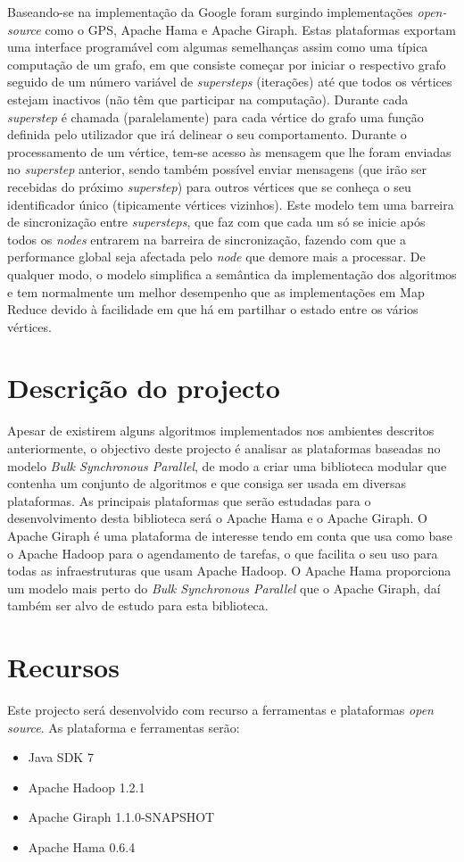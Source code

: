 Baseando-se na implementação da Google foram surgindo implementações \textit{open-source} como o GPS\cite{docgps}, Apache Hama\cite{hama} e Apache Giraph\cite{giraph}.
Estas plataformas exportam uma interface programável com algumas semelhanças assim como uma típica computação de um grafo, em que consiste começar por iniciar o respectivo grafo seguido de um número variável de \textit{supersteps} (iterações) até que todos os vértices estejam inactivos (não têm que participar na computação).
Durante cada \textit{superstep} é chamada (paralelamente) para cada vértice do grafo uma função definida pelo utilizador que irá delinear o seu comportamento.
Durante o processamento de um vértice, tem-se acesso às mensagem que lhe foram enviadas no \textit{superstep} anterior, sendo também possível enviar mensagens (que irão ser recebidas do próximo \textit{superstep}) para outros vértices que se conheça o seu identificador único (tipicamente vértices vizinhos).
Este modelo tem uma barreira de sincronização entre \textit{supersteps}, que faz com que cada um só se inicie após todos os \textit{nodes} entrarem na barreira de sincronização, fazendo com que a performance global seja afectada pelo \textit{node} que demore mais a processar.
De qualquer modo, o modelo simplifica a semântica da implementação dos algoritmos e tem normalmente um melhor desempenho que as implementações em Map Reduce devido à facilidade em que há em partilhar o estado entre os vários vértices. 


\section{Descrição do projecto}
Apesar de existirem alguns algoritmos implementados nos ambientes descritos anteriormente, o objectivo deste projecto é analisar as plataformas
baseadas no modelo \textit{Bulk Synchronous Parallel}, de modo a criar uma biblioteca modular que contenha um conjunto de algoritmos e que consiga
ser usada em diversas plataformas. As principais plataformas que serão estudadas para o desenvolvimento desta biblioteca será o Apache Hama e o Apache Giraph. 
O Apache Giraph é uma plataforma de interesse tendo em conta que usa como base o Apache Hadoop para o agendamento de tarefas, o que facilita o seu uso
para todas as infraestruturas que usam Apache Hadoop. O Apache Hama proporciona um modelo mais perto do \textit{Bulk Synchronous Parallel} que o Apache Giraph, daí também ser
alvo de estudo para esta biblioteca.


\section{Recursos}
Este projecto será desenvolvido com recurso a ferramentas e plataformas \textit{open source}.
As plataforma e ferramentas serão:
\begin{itemize}
 \item Java SDK 7
 \item Apache Hadoop 1.2.1
 \item Apache Giraph 1.1.0-SNAPSHOT
 \item Apache Hama 0.6.4
\end{itemize}

